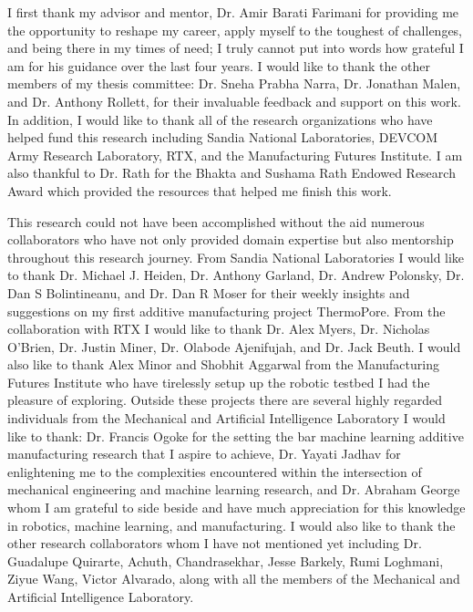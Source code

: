 \begin{acknowledgments}
I first thank my advisor and mentor, Dr. Amir Barati Farimani for providing me
the opportunity to reshape my career, apply myself to the toughest of
challenges, and being there in my times of need; I truly cannot put into words
how grateful I am for his guidance over the last four years. I would like to
thank the other members of my thesis committee: Dr. Sneha Prabha Narra, Dr.
Jonathan Malen, and Dr. Anthony Rollett, for their invaluable feedback and
support on this work. In addition, I would like to thank all of the research
organizations who have helped fund this research including Sandia National
Laboratories, DEVCOM Army Research Laboratory, RTX, and the Manufacturing
Futures Institute. I am also thankful to Dr. Rath for the Bhakta and Sushama
Rath Endowed Research Award which provided the resources that helped me finish
this work.

This research could not have been accomplished without the aid numerous
collaborators who have not only provided domain expertise but also mentorship
throughout this research journey. From Sandia National Laboratories I would like
to thank Dr. Michael J. Heiden, Dr. Anthony Garland, Dr. Andrew Polonsky, Dr.
Dan S Bolintineanu, and Dr. Dan R Moser for their weekly insights and
suggestions on my first additive manufacturing project ThermoPore. From the
collaboration with RTX I would like to thank Dr. Alex Myers, Dr. Nicholas
O'Brien, Dr. Justin Miner, Dr. Olabode Ajenifujah, and Dr. Jack Beuth. I would
also like to thank Alex Minor and Shobhit Aggarwal from the Manufacturing
Futures Institute who have tirelessly setup up the robotic testbed I had the
pleasure of exploring. Outside these projects there are several highly regarded
individuals from the Mechanical and Artificial Intelligence Laboratory I would
like to thank: Dr. Francis Ogoke for the setting the bar machine learning
additive manufacturing research that I aspire to achieve, Dr. Yayati Jadhav for
enlightening me to the complexities encountered within the intersection of
mechanical engineering and machine learning research, and Dr. Abraham George
whom I am grateful to side beside and have much appreciation for this knowledge
in robotics, machine learning, and manufacturing. I would also like to thank the
other research collaborators whom I have not mentioned yet including Dr.
Guadalupe Quirarte, Achuth, Chandrasekhar, Jesse Barkely, Rumi Loghmani, Ziyue
Wang, Victor Alvarado, along with all the members of the Mechanical and
Artificial Intelligence Laboratory.


\end{acknowledgments}
